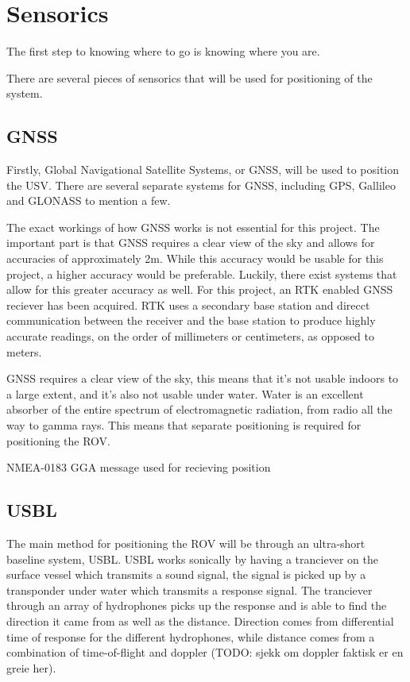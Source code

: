 \documentclass[class=article, crop=false, draft=true]{standalone}
\begin{document}
\section{Sensorics}
The first step to knowing where to go is knowing where you are.

There are several pieces of sensorics that will be used for positioning of the system.

\subsection{GNSS}
Firstly, Global Navigational Satellite Systems, or GNSS, will be used to position the USV. There are several separate systems for GNSS, including GPS, Gallileo and GLONASS to mention a few.

The exact workings of how GNSS works is not essential for this project. The important part is that GNSS requires a clear view of the sky and allows for accuracies of approximately 2m. While this accuracy would be usable for this project, a higher accuracy would be preferable. Luckily, there exist systems that allow for this greater accuracy as well. For this project, an RTK enabled GNSS reciever has been acquired. RTK uses a secondary base station and direcct communication between the receiver and the base station to produce highly accurate readings, on the order of millimeters or centimeters, as opposed to meters.

GNSS requires a clear view of the sky, this means that it's not usable indoors to a large extent, and it's also not usable under water. Water is an excellent absorber of the entire spectrum of electromagnetic radiation, from radio all the way to gamma rays. This means that separate positioning is required for positioning the ROV.

NMEA-0183 GGA message used for recieving position

\subsection{USBL}
The main method for positioning the ROV will be through an ultra-short baseline system, USBL. USBL works sonically by having a tranciever on the surface vessel which transmits a sound signal, the signal is picked up by a transponder under water which transmits a response signal. The tranciever through an array of hydrophones picks up the response and is able to find the direction it came from as well as the distance. Direction comes from differential time of response for the different hydrophones, while distance comes from a combination of time-of-flight and doppler (TODO: sjekk om doppler faktisk er en greie her).
\end{document}
